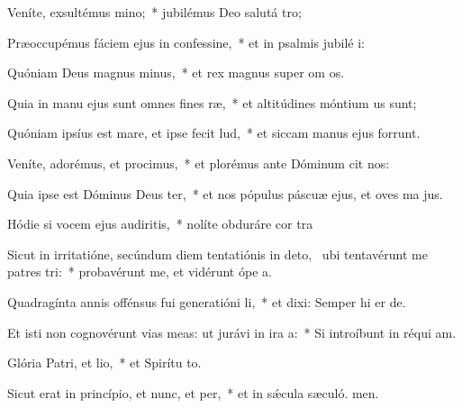\item Veníte, exsultémus mino;~* jubilémus Deo salutá tro;
\item Præoccupémus fáciem ejus in confessine,~* et in psalmis jubilé i:
\item Quóniam Deus magnus minus,~* et rex magnus super om os.
\item Quia in manu ejus sunt omnes fines ræ,~* et altitúdines móntium us sunt;
\item Quóniam ipsíus est mare, et ipse fecit lud,~* et siccam manus ejus forrunt.
\item Veníte, adorémus, et procimus,~* et plorémus ante Dóminum  cit nos:
\item Quia ipse est Dóminus Deus ter,~* et nos pópulus páscuæ ejus, et oves ma jus.
\item Hódie si vocem ejus audiritis,~* nolíte obduráre cor tra
\item Sicut in irritatióne, secúndum diem tentatiónis in deto,~\pscross{} ubi tentavérunt me patres tri:~* probavérunt me, et vidérunt ópe a.
\item Quadragínta annis offénsus fui generatióni li,~* et dixi: Semper hi er de.
\item Et isti non cognovérunt vias meas: ut jurávi in ira a:~* Si introíbunt in réqui am.
\item Glória Patri, et lio,~* et Spirítu to.
\item Sicut erat in princípio, et nunc, et per,~* et in sǽcula sæculó. men.
